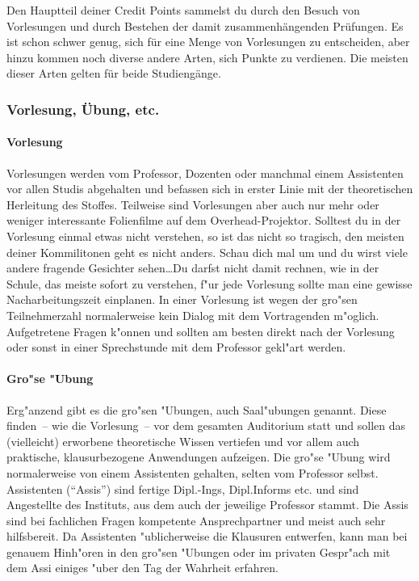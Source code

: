 Den Hauptteil deiner  Credit Points sammelst du durch den Besuch von
Vorlesungen und durch Bestehen der damit zusammenhängenden Prüfungen. Es
ist schon schwer genug, sich für eine Menge von Vorlesungen zu
entscheiden, aber hinzu kommen noch diverse andere Arten, sich Punkte zu
verdienen. Die meisten dieser Arten gelten für beide Studiengänge.
\subsubsection{Vorlesung, Übung, etc.}
\paragraph*{Vorlesung}

Vorlesungen werden vom Professor, Dozenten oder manchmal einem Assistenten vor allen Studis abgehalten und befassen
sich in erster Linie mit der theoretischen Herleitung des Stoffes. Teilweise
sind Vorlesungen aber auch nur mehr oder weniger interessante Folienfilme auf
dem Overhead-Projektor. Solltest du in der Vorlesung einmal etwas nicht
verstehen, so ist das nicht so tragisch, den meisten deiner Kommilitonen geht
es nicht anders. Schau dich mal um und du wirst viele andere fragende Gesichter
sehen\ldots Du darfst nicht damit rechnen, wie in der Schule, das meiste sofort zu
verstehen, f"ur jede Vorlesung sollte man eine gewisse Nacharbeitungszeit
einplanen. In einer Vorlesung ist wegen der gro"sen Teilnehmerzahl
normalerweise kein Dialog mit dem Vortragenden m"oglich. Aufgetretene Fragen
k"onnen und sollten am besten direkt nach der Vorlesung oder sonst in einer
Sprechstunde mit dem Professor gekl"art werden.


\paragraph*{Gro"se "Ubung}

Erg"anzend gibt es die gro"sen "Ubungen, auch Saal"ubungen genannt. Diese
finden~-- wie die Vorlesung~-- vor dem gesamten Auditorium statt und sollen das
(vielleicht) erworbene theoretische Wissen vertiefen und vor allem auch
praktische, klausurbezogene Anwendungen aufzeigen. Die gro"se "Ubung wird
normalerweise von einem Assistenten gehalten, selten vom Professor selbst.
Assistenten ("`Assis"') sind fertige Dipl.-Ings, Dipl.Informs etc. und sind
Angestellte des Instituts, aus dem auch der jeweilige Professor stammt. Die
Assis sind bei fachlichen Fragen kompetente Ansprechpartner und meist auch sehr
hilfsbereit. Da Assistenten "ublicherweise die Klausuren entwerfen, kann man
bei genauem Hinh"oren in den gro"sen "Ubungen oder im privaten Gespr"ach mit
dem Assi einiges "uber den Tag der Wahrheit erfahren.


